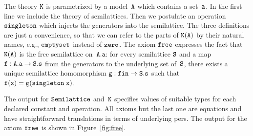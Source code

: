 %
The theory $\mathtt{K}$ is parametrized by a model~$\mathtt{A}$ which contains a
set~$\mathtt{a}$. In the first line we include the theory of semilattices.
Then we postulate an operation $\mathtt{singleton}$ which injects the
generators into the semilattice. The three definitions are just a
convenience, so that we can refer to the parts of $\mathtt{K(A)}$ by their
natural names, e.g., $\mathtt{emptyset}$ instead of $\mathtt{zero}$. The axiom
$\mathtt{free}$ expresses the fact that $\mathtt{K}(\mathtt{A})$ is the free
semilattice on~$\mathtt{A.a}$: for every semilattice $\mathtt{S}$ and a map
$\mathtt{f} : \mathtt{A.a} \to \mathtt{S.s}$ from the generators to the underlying
set of~$\mathtt{S}$, there exists a unique semilattice homomorphism $\mathtt{g}
: \mathtt{fin} \to \mathtt{S.s}$ such that $\mathtt{f}(\mathtt{x}) = \mathtt{g}(\mathtt{singleton\;
  x})$.

The output for $\mathtt{Semilattice}$ and~$\mathtt{K}$ specifies
values of suitable types for each declared constant and operation. All
axioms but the last one are equations and have straightforward
translations in terms of underlying pers. The output for the axiom
$\mathtt{free}$ is shown in Figure~\ref{fig:free}.
%
